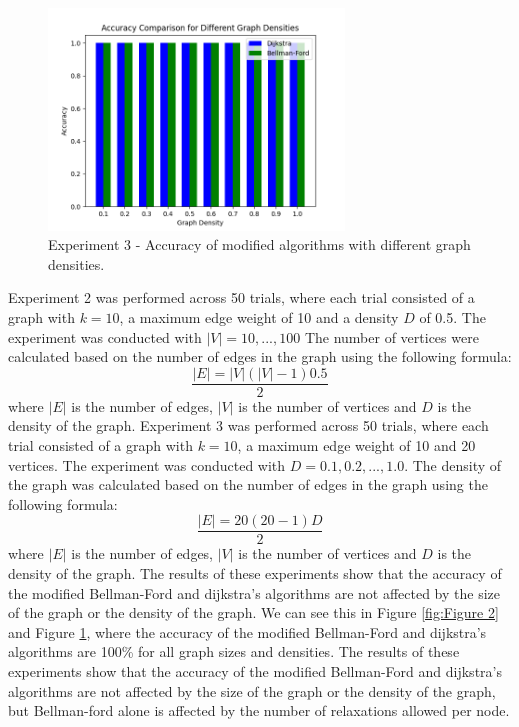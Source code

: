 \documentclass[12pt]{article}
\begin{document}
\begin{figure}[H] 
    \centering
    \includegraphics[width=0.7\textwidth]{Figures/Accuracies_densities.png} 
    \caption{\footnotesize Experiment 3 - Accuracy of modified algorithms with different graph densities.}
    \label{fig:Figure 3} 
\end{figure}

Experiment 2 was performed across 50 trials, where each trial consisted of a graph with $k=10$, a maximum edge weight of 10 and a density $D$ of 0.5. The experiment was conducted with $|V| = 10, ... , 100$ The number of vertices were calculated based on the number of edges in the graph using the following formula: $$\frac{|E| = |V|(|V| - 1) 0.5}{2}$$
where $|E|$ is the number of edges, $|V|$ is the number of vertices and $D$ is the density of the graph. 
\smallskip
\newline
\indent
Experiment 3 was performed across 50 trials, where each trial consisted of a graph with $k = 10$, a maximum edge weight of 10 and 20 vertices. The experiment was conducted with $D = 0.1, 0.2, ... , 1.0$. The density of the graph was calculated based on the number of edges in the graph using the following formula: $$\frac{|E| = 20(20 - 1) D}{2}$$
where $|E|$ is the number of edges, $|V|$ is the number of vertices and $D$ is the density of the graph.
\smallskip
\newline
\indent
The results of these experiments show that the accuracy of the modified Bellman-Ford and dijkstra's algorithms are not affected by the size of the graph
or the density of the graph. We can see this in Figure \ref{fig:Figure 2} and Figure \ref{fig:Figure 3}, where the accuracy of the modified Bellman-Ford and dijkstra's algorithms are 100\% for all graph sizes and densities. 
\smallskip
\newline
\indent
The results of these experiments show that the accuracy of the modified Bellman-Ford and dijkstra's algorithms are not affected by the size of the graph or the density of the graph, but Bellman-ford alone is 
affected by the number of relaxations allowed per node.
\end{document}
